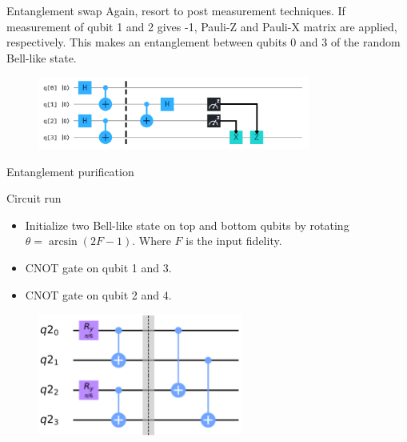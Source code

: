 \begin{frame}{Entanglement swap}
	Again, resort to post measurement techniques. If measurement of qubit 1 and 2 gives -1, Pauli-Z  and Pauli-X matrix are applied, respectively. This makes an entanglement between qubits 0 and 3 of the random Bell-like state.
	\vspace{0.5cm}
		\begin{figure}[h] \centering
		\includegraphics[width=0.8\textwidth]{images/swap_general.png}
		\label{fig:swap_gen}
	\end{figure}
	
\end{frame}

\begin{frame}{Entanglement purification}
	
	\begin{block}{Circuit run}
		\begin{itemize}
			\item Initialize two Bell-like state on top and bottom qubits by rotating $\theta = \arcsin{\left(2F-1\right)}$. Where $F$ is the input fidelity.
			\item CNOT gate on qubit 1 and 3.
			\item CNOT gate on qubit 2 and 4.
		\end{itemize}
	\end{block}
	
	\begin{figure}[h] \centering
		\includegraphics[width=0.6\textwidth]{images/purification_circuit.png}
		\label{fig:puri_circ}
	\end{figure}
	
\end{frame}

